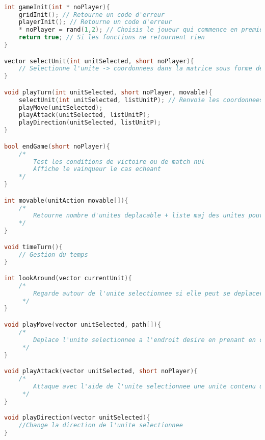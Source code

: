 \documentclass[a4paper,10pt]{extreport}
\begin{document}
\begin{lstlisting}[language=c]

int gameInit(int * noPlayer){
	gridInit(); // Retourne un code d'erreur
	playerInit(); // Retourne un code d'erreur
	* noPlayer = rand(1,2); // Choisis le joueur qui commence en premier
	return true; // Si les fonctions ne retournent rien
}

vector selectUnit(int unitSelected, short noPlayer){
	// Selectionne l'unite -> coordonnees dans la matrice sous forme de vecteur
}

void playTurn(int unitSelected, short noPlayer, movable){
	selectUnit(int unitSelected, listUnitP); // Renvoie les coordonnees de l'unite selectionnee
	playMove(unitSelected);
	playAttack(unitSelected, listUnitP);
	playDirection(unitSelected, listUnitP);
}

bool endGame(short noPlayer){
	/* 	
		Test les conditions de victoire ou de match nul
	 	Affiche le vainqueur le cas echeant
	*/
}

int movable(unitAction movable[]){
	/* 	
		Retourne nombre d'unites deplacable + liste maj des unites pouvant se deplacer
	*/
}

void timeTurn(){
	// Gestion du temps
}

int lookAround(vector currentUnit){
	/*
		Regarde autour de l'unite selectionnee si elle peut se deplacer sur une case si TP pas permise alors deplacement impossible
	 */
}

void playMove(vector unitSelected, path[]){
	/*
		Deplace l'unite selectionnee a l'endroit desire en prenant en compte les chemins possibles
	 */
}

void playAttack(vector unitSelected, short noPlayer){
	/*
		Attaque avec l'aide de l'unite selectionnee une unite contenu dans la liste listUnitP
	 */
}

void playDirection(vector unitSelected){
	//Change la direction de l'unite selectionnee
}

\end{lstlisting}
\end{document}
